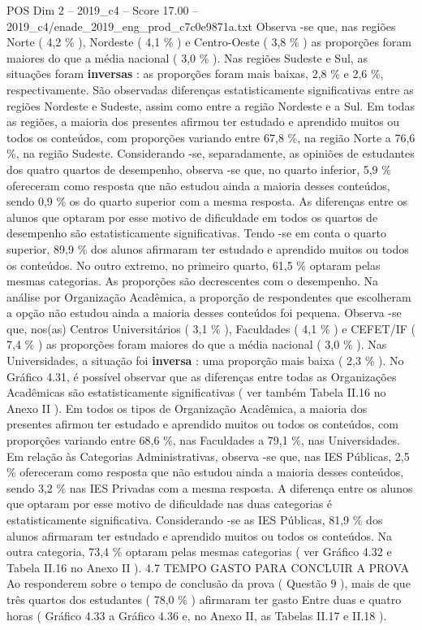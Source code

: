 \begin{textsample}{POS Dim 2 – 2019\_c4 – Score 17.00 – 2019\_c4/enade\_2019\_eng\_prod\_c7c0e9871a.txt}
Observa -se que, nas regiões Norte ( 4,2 \% ), Nordeste ( 4,1 \% ) e Centro-Oeste ( 3,8 \% ) as proporções foram maiores do que a média nacional ( 3,0 \% ).
Nas regiões Sudeste e Sul, as situações foram \textbf{inversas} : as proporções foram mais baixas, 2,8 \% e 2,6 \%, respectivamente.
São observadas diferenças estatisticamente significativas entre as regiões Nordeste e Sudeste, assim como entre a região Nordeste e a Sul.
Em todas as regiões, a maioria dos presentes afirmou ter estudado e aprendido muitos ou todos os conteúdos, com proporções variando entre 67,8 \%, na região Norte a 76,6 \%, na região Sudeste.
Considerando -se, separadamente, as opiniões de estudantes dos quatro quartos de desempenho, observa -se que, no quarto inferior, 5,9 \% ofereceram como resposta que não estudou ainda a maioria desses conteúdos, sendo 0,9 \% os do quarto superior com a mesma resposta.
As diferenças entre os alunos que optaram por esse motivo de dificuldade em todos os quartos de desempenho são estatisticamente significativas.
Tendo -se em conta o quarto superior, 89,9 \% dos alunos afirmaram ter estudado e aprendido muitos ou todos os conteúdos.
No outro extremo, no primeiro quarto, 61,5 \% optaram pelas mesmas categorias.
As proporções são decrescentes com o desempenho.
Na análise por Organização Acadêmica, a proporção de respondentes que escolheram a opção não estudou ainda a maioria desses conteúdos foi pequena.
Observa -se que, nos(as) Centros Universitários ( 3,1 \% ), Faculdades ( 4,1 \% ) e CEFET/IF ( 7,4 \% ) as proporções foram maiores do que a média nacional ( 3,0 \% ).
Nas Universidades, a situação foi \textbf{inversa} : uma proporção mais baixa ( 2,3 \% ).
No Gráfico 4.31, é possível observar que as diferenças entre todas as Organizações Acadêmicas são estatisticamente significativas ( ver também Tabela II.16 no Anexo II ).
Em todos os tipos de Organização Acadêmica, a maioria dos presentes afirmou ter estudado e aprendido muitos ou todos os conteúdos, com proporções variando entre 68,6 \%, nas Faculdades a 79,1 \%, nas Universidades.
Em relação às Categorias Administrativas, observa -se que, nas IES Públicas, 2,5 \% ofereceram como resposta que não estudou ainda a maioria desses conteúdos, sendo 3,2 \% nas IES Privadas com a mesma resposta.
A diferença entre os alunos que optaram por esse motivo de dificuldade nas duas categorias é estatisticamente significativa.
Considerando -se as IES Públicas, 81,9 \% dos alunos afirmaram ter estudado e aprendido muitos ou todos os conteúdos.
Na outra categoria, 73,4 \% optaram pelas mesmas categorias ( ver Gráfico 4.32 e Tabela II.16 no Anexo II ). 4.7 TEMPO GASTO PARA CONCLUIR A PROVA Ao responderem sobre o tempo de conclusão da prova ( Questão 9 ), mais de que três quartos dos estudantes ( 78,0 \% ) afirmaram ter gasto Entre duas e quatro horas ( Gráfico 4.33 a Gráfico 4.36 e, no Anexo II, as Tabelas II.17 e II.18 ).

\end{textsample}
